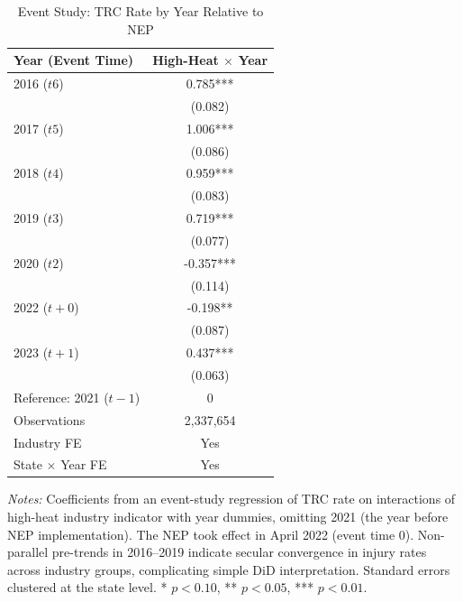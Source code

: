 \begin{table}[H]
\centering
\caption{Event Study: TRC Rate by Year Relative to NEP}
\label{tab:event}
\begin{threeparttable}
\begin{tabular}{lc}
\toprule
Year (Event Time) & High-Heat $\times$ Year \\
\midrule
2016 ($t6$) & 0.785*** \\
 & (0.082) \\
2017 ($t5$) & 1.006*** \\
 & (0.086) \\
2018 ($t4$) & 0.959*** \\
 & (0.083) \\
2019 ($t3$) & 0.719*** \\
 & (0.077) \\
2020 ($t2$) & -0.357*** \\
 & (0.114) \\
2022 ($t+0$) & -0.198** \\
 & (0.087) \\
2023 ($t+1$) & 0.437*** \\
 & (0.063) \\
\addlinespace
Reference: 2021 ($t-1$) & 0 \\
\addlinespace
\midrule
Observations & 2,337,654 \\
Industry FE & Yes \\
State $\times$ Year FE & Yes \\
\bottomrule
\end{tabular}
\begin{tablenotes}[flushleft]
\small
\item \textit{Notes:} Coefficients from an event-study regression of TRC rate on interactions of high-heat industry indicator with year dummies, omitting 2021 (the year before NEP implementation). The NEP took effect in April 2022 (event time 0). Non-parallel pre-trends in 2016--2019 indicate secular convergence in injury rates across industry groups, complicating simple DiD interpretation. Standard errors clustered at the state level. * $p<0.10$, ** $p<0.05$, *** $p<0.01$.
\end{tablenotes}
\end{threeparttable}
\end{table}

